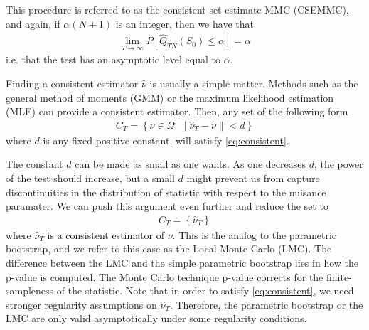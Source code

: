 \documentclass[11pt]{article}\usepackage[]{graphicx}\usepackage[]{color}
\begin{document}
This procedure is referred to as the consistent set estimate MMC (CSEMMC), and again, if $\alpha (N+1)$ is an integer, then we have that
\begin{align}
\lim\limits_{T \rightarrow \infty} P [\hat{Q}_{TN}(S_0) \leq \alpha] = \alpha
\end{align}
i.e. that the test has an asymptotic level equal to $\alpha$.

Finding a consistent estimator $\hat{\nu}$ is usually a simple matter. Methods such as the general method of moments (GMM) or the maximum likelihood estimation (MLE) can provide a consistent estimator. Then, any set of the following form
\begin{align}
C_T = \left\lbrace \nu \in \Omega : \parallel \hat{\nu}_T - \nu \parallel < d \right\rbrace
\end{align}
where $d$ is any fixed positive constant, will satisfy \ref{eq:consistent}.

The constant $d$ can be made as small as one wants. As one decreases $d$, the power of the test should increase, but a small $d$ might prevent us from capture discontinuities in the distribution of statistic with respect to the nuisance paramater. We can push this argument even further and reduce the set to
\begin{align}
C_T = \left\lbrace \hat{\nu}_T \right\rbrace
\end{align}
where $\hat{\nu}_T$ is a consistent estimator of $\nu$. This is the analog to the parametric bootstrap, and we refer to this case as the Local Monte Carlo (LMC). The difference between the LMC and the simple parametric bootstrap lies in how the p-value is computed. The Monte Carlo technique p-value corrects for the finite-sampleness of the statistic. Note that in order to satisfy \ref{eq:consistent}, we need stronger regularity assumptions on $\hat{\nu}_T$. Therefore, the parametric bootstrap or the LMC are only valid asymptotically under some regularity conditions.
\end{document}
